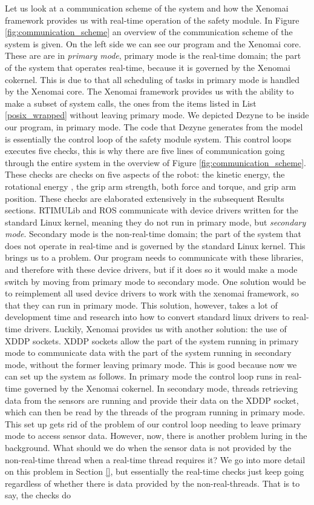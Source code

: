\documentclass[12pt]{scrreprt}
\begin{document}
Let us look at a communication scheme of the system and how the Xenomai framework provides us with real-time operation of the safety module. In Figure \ref{fig:communication_scheme} an overview of the communication scheme of the system is given. On the left side we can see our program and the Xenomai core. These are are in \textit{primary mode}, primary mode is the real-time domain; the part of the system that operates real-time, because it is governed by the Xenomai cokernel. This is due to that all scheduling of tasks in primary mode is handled by the Xenomai core. The Xenomai framework provides us with the ability to make a subset of system calls, the ones from the items listed in List \ref{posix_wrapped} without leaving primary mode. We depicted Dezyne to be inside our program, in primary mode. The code that Dezyne generates from the model is essentially the control loop of the safety module system. This control loops executes five checks, this is why there are five lines of communication going through the entire system in the overview of Figure \ref{fig:communication_scheme}. These checks are checks on five aspects of the robot: the kinetic energy, the rotational energy , the grip arm strength, both force and torque, and grip arm position. These checks are elaborated extensively in the subsequent Results sections. RTIMULib and ROS communicate with device drivers written for the standard Linux kernel, meaning they do not run in primary mode, but \textit{secondary mode}. Secondary mode is the non-real-time domain; the part of the system that does not operate in real-time and is governed by the standard Linux kernel. This brings us to a problem. Our program needs to communicate with these libraries, and therefore with these device drivers, but if it does so it would make a mode switch by moving from primary mode to secondary mode. One solution would be to reimplement all used device drivers to work with the xenomai framework, so that they can run in primary mode. This solution, however, takes a lot of development time and research into how to convert standard linux drivers to real-time drivers. Luckily, Xenomai provides us with another solution: the use of XDDP sockets. XDDP sockets allow the part of the system running in primary mode to communicate data with the part of the system running in secondary mode, without the former leaving primary mode. This is good because now we can set up the system as follows. In primary mode the control loop runs in real-time governed by the Xenomai cokernel. In secondary mode, threads retrieving data from the sensors are running and provide their data on the XDDP socket, which can then be read by the threads of the program running in primary mode. This set up gets rid of the problem of our control loop needing to leave primary mode to access sensor data. However, now, there is another problem luring in the background. What should we do when the sensor data is not provided by the non-real-time thread when a real-time thread requires it? We go into more detail on this problem in Section \ref{}, but essentially the real-time checks just keep going regardless of whether there is data provided by the non-real-threads. That is to say, the checks do 
\end{document}
